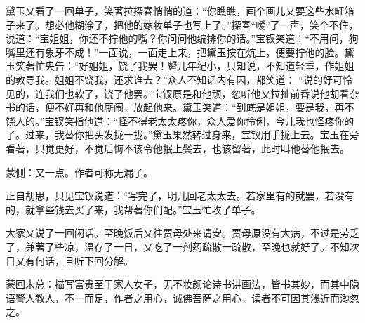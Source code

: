 \begin{parag}
    黛玉又看了一回单子，笑著拉探春悄悄的道：“你瞧瞧，画个画儿又要这些水缸箱子来了。想必他糊涂了，把他的嫁妆单子也写上了。”探春“嗳”了一声，笑个不住，说道：“宝姐姐，你还不拧他的嘴？你问问他编排你的话。”宝钗笑道：“不用问，狗嘴里还有象牙不成！”一面说，一面走上来，把黛玉按在炕上，便要拧他的脸。黛玉笑著忙央告：“好姐姐，饶了我罢！颦儿年纪小，只知说，不知道轻重，作姐姐的教导我。姐姐不饶我，还求谁去？”众人不知话内有因，都笑道： “说的好可怜见的，连我们也软了，饶了他罢。”宝钗原是和他顽，忽听他又拉扯前番说他胡看杂书的话，便不好再和他厮闹，放起他来。黛玉笑道：“到底是姐姐，要是我，再不饶人的。”宝钗笑指他道：“怪不得老太太疼你，众人爱你伶俐，今儿我也怪疼你的了。过来，我替你把头发拢一拢。”黛玉果然转过身来，宝钗用手拢上去。宝玉在旁看著，只觉更好，不觉后悔不该令他抿上鬓去，也该留著，此时叫他替他抿去。\begin{note}蒙侧：又一点。作者可称无漏子。\end{note}正自胡思，只见宝钗说道：“写完了，明儿回老太太去。若家里有的就罢，若没有的，就拿些钱去买了来，我帮著你们配。”宝玉忙收了单子。
\end{parag}


\begin{parag}
    大家又说了一回闲话。至晚饭后又往贾母处来请安。贾母原没有大病，不过是劳乏了，兼著了些凉，温存了一日，又吃了一剂药疏散一疏散，至晚也就好了。不知次日又有何话，且听下回分解。
\end{parag}


\begin{parag}
    \begin{note}蒙回末总：描写富贵至于家人女子，无不妆颜论诗书讲画法，皆书其妙，而其中隐语警人教人，不一而足，作者之用心，诚佛菩萨之用心，读者不可因其浅近而渺忽之。\end{note}
\end{parag}

